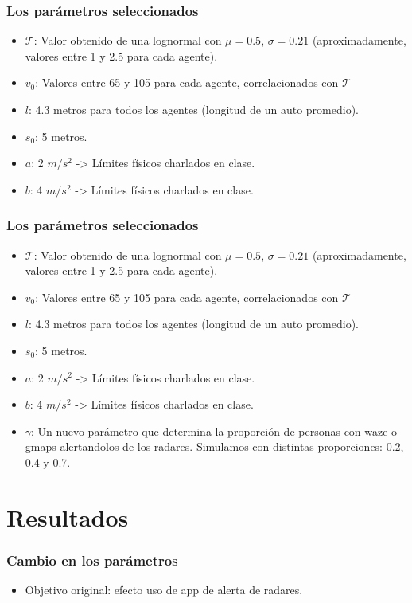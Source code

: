 \documentclass[10pt, compress]{beamer}
\begin{document}
\begin{frame}[fragile]
\frametitle{Los par\'ametros seleccionados}

\begin{itemize}

\item $\mathcal{T}$: Valor obtenido de una lognormal con $\mu = 0.5$, $\sigma = 0.21$ (aproximadamente, valores entre 1 y 2.5 para cada agente).
\item $v_0$: Valores entre 65 y 105 para cada agente, correlacionados con $\mathcal{T}$
\item $l$: 4.3 metros para todos los agentes (longitud de un auto promedio).
\item $s_0$: 5 metros.
\item $a$: 2 $m/s^2$ -> Límites físicos charlados en clase.
\item $b$: 4 $m/s^2$ -> Límites físicos charlados en clase.

\end{itemize}
\addtocounter{framenumber}{-1}
\end{frame}

\begin{frame}[fragile]
\frametitle{Los par\'ametros seleccionados}

\begin{itemize}

\item $\mathcal{T}$: Valor obtenido de una lognormal con $\mu = 0.5$, $\sigma = 0.21$ (aproximadamente, valores entre 1 y 2.5 para cada agente).
\item $v_0$: Valores entre 65 y 105 para cada agente, correlacionados con $\mathcal{T}$
\item $l$: 4.3 metros para todos los agentes (longitud de un auto promedio).
\item $s_0$: 5 metros.
\item $a$: 2 $m/s^2$ -> Límites físicos charlados en clase.
\item $b$: 4 $m/s^2$ -> Límites físicos charlados en clase.
\item $\gamma$: Un nuevo par\'ametro que determina la proporci\'on de personas con waze o gmaps alertandolos de los radares. Simulamos con distintas proporciones: 0.2, 0.4 y 0.7.

\end{itemize}
\addtocounter{framenumber}{-1}
\end{frame}

\section{Resultados}
\addtocounter{framenumber}{-1}
\begin{frame}[fragile]
\frametitle{Cambio en los par\'ametros}

\begin{itemize}
\item Objetivo original: efecto uso de app de alerta de radares.
\end{itemize}

\end{frame}
\end{document}
